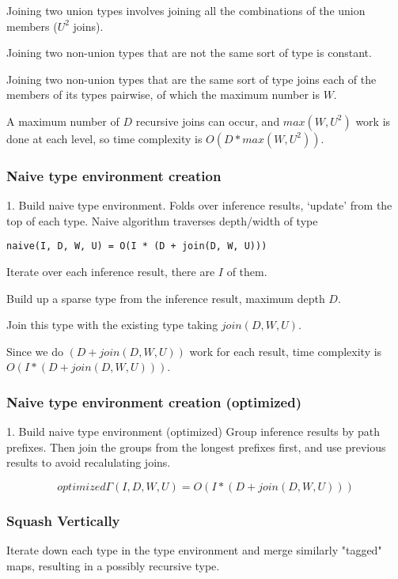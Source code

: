 Joining two union types involves joining all the combinations of the union members ($U^2$ joins).

Joining two non-union types that are not the same sort of type is constant.

Joining two non-union types that are the same sort of type joins
each of the members of its types pairwise, of which the maximum number is $W$.

A maximum number of $D$ recursive joins can occur, and $max(W, U^2)$ work is done
at each level, so time complexity is $O(D * max(W, U^2))$.

\subsubsection{Naive type environment creation}

1. Build naive type environment.
   Folds over inference results, `update' from the top of each type.
   Naive algorithm traverses depth/width of type 

\begin{verbatim}
naive(I, D, W, U) = O(I * (D + join(D, W, U)))
\end{verbatim}

Iterate over each inference result, there are $I$ of them.

Build up a sparse type from the inference result, maximum depth $D$.

Join this type with the existing type taking $join(D, W, U)$.

Since we do $(D + join(D, W, U))$ work for each result, time complexity
is $O(I * (D + join(D, W, U)))$.

\subsubsection{Naive type environment creation (optimized)}

1. Build naive type environment (optimized)
  Group inference results by path prefixes. Then join the groups
  from the longest prefixes first, and use previous results to avoid
  recalulating joins.

\[
optimized\Gamma(I, D, W, U) = O(I * (D + join(D, W, U)))
\]

\subsubsection{Squash Vertically}

Iterate down each type in the type environment and merge similarly "tagged"
maps, resulting in a possibly recursive type.

